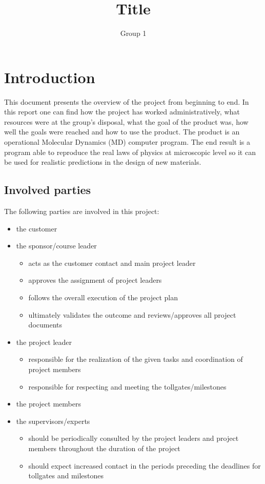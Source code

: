 \documentclass[12pt,a4paper]{article}
\begin{document}
\title{Title}
\author{Group 1}
 
\granskad{}{\today}
\godkand{}{\today}
\maketitle
\makestatus
\makeprojektidentitet
\makegruppmedlemmar
\makeprojektinfo
\makeinnehall

\section{Introduction}
\label{sec:Introduction}
This document presents the overview of the project from beginning to end. In this report one can find how the project has worked administratively, what resources were at the group's disposal, what the goal of the product was, how well the goals were reached and how to use the product. The product is an operational Molecular Dynamics (MD) computer program. The end result is a program able to reproduce the real laws of physics at microscopic level so it can be used for realistic predictions in the design of new materials.

\subsection{Involved parties}
The following parties are involved in this project:
\begin{itemize}
\item the customer
\item the sponsor/course leader
	\begin{itemize}
	\item acts as the customer contact and main project leader
	\item approves the assignment of project leaders
	\item follows the overall execution of the project plan
	\item ultimately validates the outcome and reviews/approves all project documents
	\end{itemize}
\item the project leader
	\begin{itemize}
	\item responsible for the realization of the given tasks and coordination of project members
	\item responsible for respecting and meeting the tollgates/milestones
	\end{itemize}
\item the project members
\item the supervisors/experts
	\begin{itemize}
	\item should be periodically consulted by the project leaders and project members throughout the duration of the project
	\item should expect increased contact in the periods preceding the deadlines for tollgates and milestones
	\end{itemize}
\end{itemize}
\end{document}
